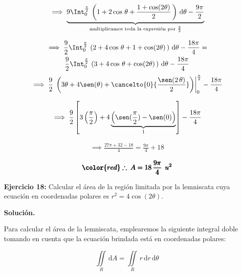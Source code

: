 \documentclass[12pt]{article}
\begin{document}
\begin{align*}
	\implies \underbrace{9\Int_{0}^{\frac{\pi}{2}}\, \left(1+2\cos\,\theta+\frac{1+\cos(2\theta)}{2}\,\right)\, \mathrm{d}\theta - \frac{9\pi}{2}}_{\text{multiplicamos toda la expresión por $\frac{2}{2}$}}
\end{align*}

\begin{multline*}
	\implies \frac{9}{2}\Int_{0}^{\frac{\pi}{2}}\, \left(2+4\cos\,\theta+1+\cos(2\theta)\,\right)\, \mathrm{d}\theta - \frac{18\pi}{4} =\\ \frac{9}{2}\Int_{0}^{\frac{\pi}{2}}\, \left(3+4\cos\,\theta+\cos(2\theta)\,\right)\, \mathrm{d}\theta - \frac{18\pi}{4}
\end{multline*}
\begin{align*}
	\implies \frac{9}{2}\,\left.\left(3\theta+4\sen(\theta)+\cancelto{0}{\frac{\sen(2\,\theta)}{2}}\right)\right|_{0}^{\frac{\pi}{2}} - \frac{18\pi}{4}
\end{align*}

\begin{align*}
	\implies \frac{9}{2}\left[3\left(\frac{\pi}{2}\right) + 4\underbrace{\left(\sen(\frac{\pi}{2})-\sen(0)\right)}_{1} \right] - \frac{18\pi}{4}
\end{align*}

\begin{align*}
	\implies \frac{27\pi + 32 - 18}{4} = \frac{9\pi}{4} + 18
\end{align*}

\begin{align*}
	\pmb{\color{red} \therefore\: A = 18\,\frac{9\pi}{4}\: \: u^2}
\end{align*}

\noindent \textbf{Ejercicio 18:} Calcular el área de la región limitada por la lemniscata cuya ecuación en coordenadas polares es $r^2=4\cos(2\theta)$.

\vspace{5mm}

\noindent \textbf{Solución.}

\vspace{3mm}

\noindent Para calcular el área de la lemniscata, emplearemos la siguiente integral doble tomando en cuenta que la ecuación brindada está en coordenadas polares:

\begin{equation}\label{eqn:18-1}\tag{1}
	\iint\limits_R\, \mathrm{d}A = \iint\limits_R\, r\,\mathrm{d}r\,\mathrm{d}\theta
\end{equation}
\end{document}
